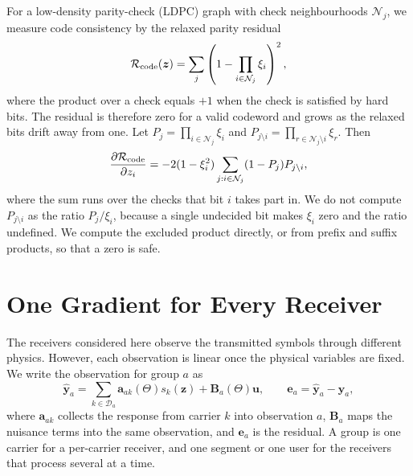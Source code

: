 \documentclass[11pt]{article}
\begin{document}
For a low-density parity-check (LDPC) graph with check neighbourhoods
$\mathcal N_j$, we measure code consistency by the relaxed parity residual
\begin{equation}
  \mathcal R_{\rm code}(\bm z)
  =
  \sum_j
  \left(1-\prod_{i\in\mathcal N_j}\xi_i\right)^2,
  \label{eq:parity_penalty}
\end{equation}
where the product over a check equals $+1$ when the check is satisfied by hard
bits.  The residual is therefore zero for a valid codeword and grows as the
relaxed bits drift away from one.  Let $P_j=\prod_{i\in\mathcal N_j}\xi_i$ and
$P_{j\setminus i}=\prod_{r\in\mathcal N_j\setminus i}\xi_r$.  Then
\begin{equation}
  \frac{\partial \mathcal R_{\rm code}}{\partial z_i}
  =
  -2(1-\xi_i^2)
  \sum_{j:i\in\mathcal N_j}
  (1-P_j)P_{j\setminus i},
  \label{eq:parity_gradient}
\end{equation}
where the sum runs over the checks that bit $i$ takes part in.  We do not
compute $P_{j\setminus i}$ as the ratio $P_j/\xi_i$, because a single undecided
bit makes $\xi_i$ zero and the ratio undefined.  We compute the excluded
product directly, or from prefix and suffix products, so that a zero is safe.

\section{One Gradient for Every Receiver}

The receivers considered here observe the transmitted symbols through different
physics.  However, each observation is linear once the physical variables are
fixed.  We write the observation for group $a$ as
\begin{equation}
  \widehat{\bm y}_a
  =
  \sum_{k\in\mathcal D_a}\bm a_{ak}(\Theta)s_k(\bm z)
  +\bm B_a(\Theta)\bm u,
  \qquad
  \bm e_a=\widehat{\bm y}_a-\bm y_a,
  \label{eq:local_model}
\end{equation}
where $\bm a_{ak}$ collects the response from carrier $k$ into observation $a$,
$\bm B_a$ maps the nuisance terms into the same observation, and $\bm e_a$ is
the residual.  A group is one carrier for a per-carrier receiver, and one
segment or one user for the receivers that process several at a time.
\end{document}
